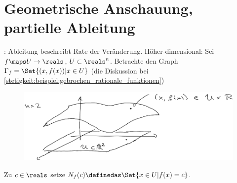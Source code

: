 \section{Geometrische Anschauung, partielle Ableitung}
: Ableitung beschreibt Rate der Veränderung. Höher-dimensional: Sei \( f\maps U\to \reals \), \( U\subset \reals^n \). Betrachte den Graph \( \Gamma_f=\Set{(x,f(x))|x\in U} \) (\vgl die Diskussion bei \ref{stetigkeit:beispiel:gebrochen_rationale_funktionen})
\begin{figure}[H]
    \centering
    \includegraphics[width=0.8\linewidth]{figures/r2_zu_r_funktion_veranschaulichung}
    \label{fig:r2_zu_r_funktion_veranschaulichung}
\end{figure}
\begin{definition*}
    Zu \( c\in \reals \) setze \( N_f(c)\definedas \Set{x\in U|f(x)=c} \).
\end{definition*}
